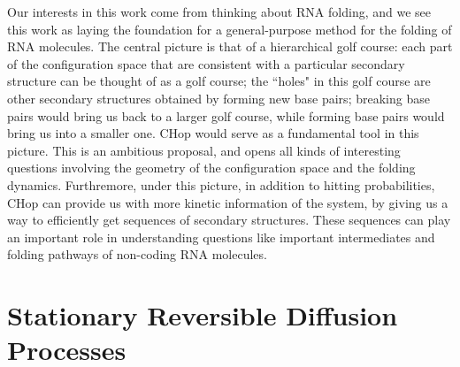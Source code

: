 \documentclass[english, aip, jcp, priprint, graphicx,floatfix]{revtex4-1}
\theoremstyle{plain}
\theoremstyle{definition}
\theoremstyle{plain}
\begin{document}
Our interests in this work come from thinking about RNA folding, and we see this work as laying the foundation for a general-purpose method for the folding of RNA molecules. The central picture is that of a hierarchical golf course: each part of the configuration space that are consistent with a particular secondary structure can be thought of as a golf course; the ``holes" in this golf course are other secondary structures obtained by forming new base pairs; breaking base pairs would bring us back to a larger golf course, while forming base pairs would bring us into a smaller one. CHop would serve as a fundamental tool in this picture. This is an ambitious proposal, and opens all kinds of interesting questions involving the geometry of the configuration space and the folding dynamics. Furthremore, under this picture, in addition to hitting probabilities, CHop can provide us with more kinetic information of the system, by giving us a way to efficiently get sequences of secondary structures. These sequences can play an important role in understanding questions like important intermediates and folding pathways of non-coding RNA molecules.

\newpage

\appendix


\appendix

                                                         


\section{Stationary Reversible Diffusion Processes}\label{sec:reversible_diffusion}
\end{document}
